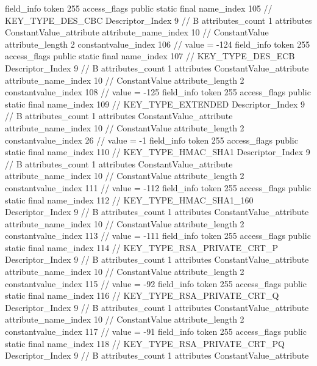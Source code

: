 {{{{			field_info {
				token	255
				access_flags	public static final
				name_index	105		// KEY_TYPE_DES_CBC
				Descriptor_Index	9		// B
				attributes_count	1
				attributes {
				ConstantValue_attribute {
					attribute_name_index	10		// ConstantValue
					attribute_length	2
					constantvalue_index	106		// value = -124
				}
				}
			}
			field_info {
				token	255
				access_flags	public static final
				name_index	107		// KEY_TYPE_DES_ECB
				Descriptor_Index	9		// B
				attributes_count	1
				attributes {
				ConstantValue_attribute {
					attribute_name_index	10		// ConstantValue
					attribute_length	2
					constantvalue_index	108		// value = -125
				}
				}
			}
			field_info {
				token	255
				access_flags	public static final
				name_index	109		// KEY_TYPE_EXTENDED
				Descriptor_Index	9		// B
				attributes_count	1
				attributes {
				ConstantValue_attribute {
					attribute_name_index	10		// ConstantValue
					attribute_length	2
					constantvalue_index	26		// value = -1
				}
				}
			}
			field_info {
				token	255
				access_flags	public static final
				name_index	110		// KEY_TYPE_HMAC_SHA1
				Descriptor_Index	9		// B
				attributes_count	1
				attributes {
				ConstantValue_attribute {
					attribute_name_index	10		// ConstantValue
					attribute_length	2
					constantvalue_index	111		// value = -112
				}
				}
			}
			field_info {
				token	255
				access_flags	public static final
				name_index	112		// KEY_TYPE_HMAC_SHA1_160
				Descriptor_Index	9		// B
				attributes_count	1
				attributes {
				ConstantValue_attribute {
					attribute_name_index	10		// ConstantValue
					attribute_length	2
					constantvalue_index	113		// value = -111
				}
				}
			}
			field_info {
				token	255
				access_flags	public static final
				name_index	114		// KEY_TYPE_RSA_PRIVATE_CRT_P
				Descriptor_Index	9		// B
				attributes_count	1
				attributes {
				ConstantValue_attribute {
					attribute_name_index	10		// ConstantValue
					attribute_length	2
					constantvalue_index	115		// value = -92
				}
				}
			}
			field_info {
				token	255
				access_flags	public static final
				name_index	116		// KEY_TYPE_RSA_PRIVATE_CRT_Q
				Descriptor_Index	9		// B
				attributes_count	1
				attributes {
				ConstantValue_attribute {
					attribute_name_index	10		// ConstantValue
					attribute_length	2
					constantvalue_index	117		// value = -91
				}
				}
			}
			field_info {
				token	255
				access_flags	public static final
				name_index	118		// KEY_TYPE_RSA_PRIVATE_CRT_PQ
				Descriptor_Index	9		// B
				attributes_count	1
				attributes {
				ConstantValue_attribute {
}}}}}}}
